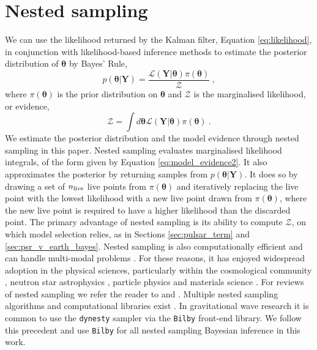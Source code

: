 \documentclass[fleqn,usenatbib,useAMS]{mnras}
\begin{document}
\section{Nested sampling}\label{sec:nested_sampling}
We can use the likelihood returned by the Kalman filter, Equation \eqref{eq:likelihood}, in conjunction with likelihood-based inference methods to estimate the posterior distribution of $\boldsymbol{\theta}$ by Bayes' Rule,
\begin{equation}
	p(\boldsymbol{\theta} | \boldsymbol{Y}) = \frac{\mathcal{L}(\boldsymbol{Y} | \boldsymbol{\theta}) \pi(\boldsymbol{\theta})}{\mathcal{Z}} \ ,
\end{equation}
where $\pi(\boldsymbol{\theta})$ is the prior distribution on $\boldsymbol{\theta}$ and $\mathcal{Z}$ is the marginalised likelihood, or evidence,
\begin{equation}
	\mathcal{Z} = \int d \boldsymbol{\theta} \mathcal{L}(\boldsymbol{Y} | \boldsymbol{\theta})  \pi(\boldsymbol{\theta})  \ . \label{eq:model_evidence2}
\end{equation}
We estimate the posterior distribution and the model evidence through nested sampling \citep{Skilling} in this paper. Nested sampling evaluates marginalised likelihood integrals, of the form given by Equation \eqref{eq:model_evidence2}. It also approximates the posterior by returning samples from $p(\boldsymbol{\theta} | \boldsymbol{Y})$. It does so by drawing a set of $n_{\rm live}$ live points from $\pi(\boldsymbol{\theta})$ and iteratively replacing the live point with the lowest likelihood with a new live point drawn from $\pi(\boldsymbol{\theta})$, where the new live point is required to have a higher likelihood than the discarded point. The primary advantage of nested sampling is its ability to compute $\mathcal{Z}$, on which model selection relies, as in Sections \ref{sec:pulsar_term} and \ref{sec:psr_v_earth_bayes}. Nested sampling is also computationally efficient and can handle multi-modal problems \citep{Ashton2022}. For these reasons, it has enjoyed widespread adoption in the physical sciences, particularly within the cosmological community \citep{Mukherjee2006,Feroz2008,Handley2015}, neutron star astrophysics \citep{Myers2021MNRAS.502.3113M,Meyers2021,Melatos2023}, particle physics \citep{proceedings2019033014} and materials science \citep{2009arXiv0906materials}. For reviews of nested sampling we refer the reader to \cite{Buchner2021} and \cite{Ashton2022}. Multiple nested sampling algorithms and computational libraries exist \citep[e.g.][]{Feroz2008,Feroz2009,Handley2015,dynesty2020,UltraNest2021}. In gravitational wave research it is common to use the \texttt{dynesty} sampler \citep{dynesty2020} via the \texttt{Bilby} \citep{bilby.507.2037A} front-end library. We follow this precedent and use \texttt{Bilby} for all nested sampling Bayesian inference in this work. \newline 
\end{document}
